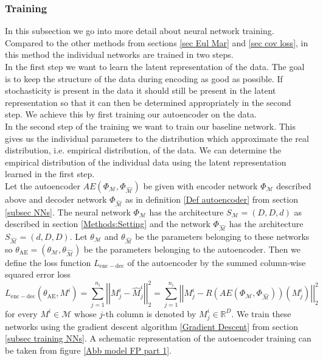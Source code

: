 \documentclass[11pt,titlepage]{article}
\newcommand{\R}{\mathbb{R}} %
\newcommand{\abs}[1]{{\left| #1 \right|}}
\theoremstyle{definition}
\theoremstyle{remark}
\begin{document}
	\subsubsection*{Training}
	
	In this subsection we go into more detail about neural network training. Compared to the other methods from sections \ref{sec Eul Mar} and \ref{sec cov loss}, in this method the individual networks are trained in two steps.\\
	In the first step we want to learn the latent representation of the data. The goal is to keep the structure of the data during encoding as good as possible. If stochasticity is present in the data it should still be present in the latent representation so that it can then be determined appropriately in the second step. We achieve this by first training our autoencoder on the data.\\
	In the second step of the training we want to train our baseline network. This gives us the individual parameters to the distribution which approximate the real distribution, i.e. empirical distribution, of the data. We can determine the empirical distribution of the individual data using the latent representation learned in the first step. \\
	
	Let the autoencoder $AE(\Phi_\mathcal{M}, \Phi_{\hat{\mathcal{M}}})$ be given with encoder network $\Phi_\mathcal{M}$ described above and decoder network $\Phi_{\hat{\mathcal{M}}}$ as in definition \ref{Def autoencoder} from section \ref{subsec NNs}. The neural network $\Phi_\mathcal{M}$ has the architecture $S_\mathcal{M}=(D,D,d)$ as described in section \ref{Methods:Setting} and the network  $\Phi_{\hat{\mathcal{M}}}$ has the architecture $S_{\hat{\mathcal{M}}}=(d,D,D)$. Let $\theta_\mathcal{M}$ and $\theta_{\hat{\mathcal{M}}}$ be the parameters belonging to these networks so $\theta_{\mathrm{AE}}= (\theta_\mathcal{M},\theta_{\hat{\mathcal{M}}})$ be the parameters belonging to the autoencoder. Then we define the loss function $L_{\mathrm{enc-dec}}$ of the autoencoder by the 
	summed column-wise squared error loss 
	\[L_{\mathrm{enc-dec}}(\theta_{\mathrm{AE}}, M^i) = \sum_{j=1}^{n_i} \abs{\abs{M^i_j- \hat{M}^i_j}}_2^2 = \sum_{j=1}^{n_i} \abs{\abs{M^i_j- R(AE(\Phi_\mathcal{M}, \Phi_{\hat{\mathcal{M}}}))(M^i_j)}}_2^2\]
	for every $M^i\in \mathcal{M}$ whose $j$-th column is denoted by $M^i_j\in\R^D$. We train these networks using the gradient descent algorithm \ref{Gradient Descent} from section \ref{subsec training NNs}. A schematic representation of the autoencoder training can be taken from figure \ref{Abb model FP part 1}.
	\newpage
	
\end{document}
